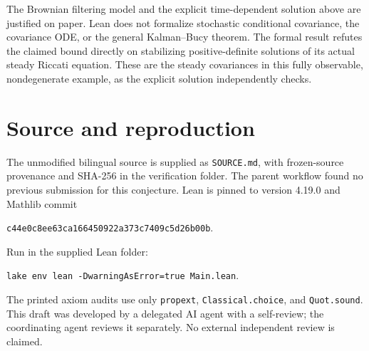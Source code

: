 \documentclass[11pt]{article}
\begin{document}
The Brownian filtering model and the explicit time-dependent solution
above are justified on paper. Lean does not formalize stochastic
conditional covariance, the covariance ODE, or the general Kalman--Bucy
theorem. The formal result refutes the claimed bound directly on
stabilizing positive-definite solutions of its actual steady Riccati
equation. These are the steady covariances in this fully observable,
nondegenerate example, as the explicit solution independently checks.

\section*{Source and reproduction}
The unmodified bilingual source is supplied as \texttt{SOURCE.md},
with frozen-source provenance and SHA-256 in the verification folder.
The parent workflow found no previous submission for this conjecture.
Lean is pinned to version 4.19.0 and Mathlib commit
\begin{center}\texttt{c44e0c8ee63ca166450922a373c7409c5d26b00b}.\end{center}
Run in the supplied Lean folder:
\begin{center}\texttt{lake env lean -DwarningAsError=true Main.lean}.\end{center}
The printed axiom audits use only \texttt{propext},
\texttt{Classical.choice}, and \texttt{Quot.sound}.
This draft was developed by a delegated AI agent with a self-review;
the coordinating agent reviews it separately. No external independent
review is claimed.
\end{document}
